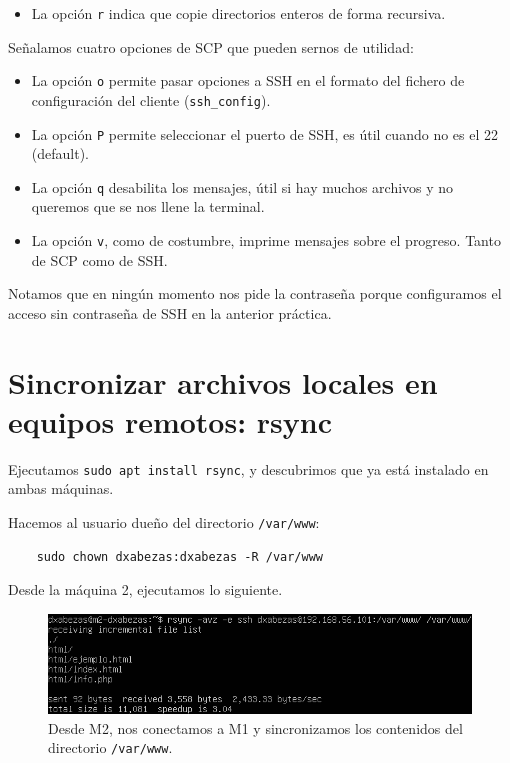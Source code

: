 \documentclass{article}
\begin{document}
\begin{itemize}
	\item La opción \texttt{r} indica que copie directorios enteros de forma recursiva.
\end{itemize}

Señalamos cuatro opciones de SCP que pueden sernos de utilidad:
\begin{itemize}
	\item La opción \texttt{o} permite pasar opciones a SSH en el formato del fichero de configuración del cliente
	 (\texttt{ssh\_config}).
	\item La opción \texttt{P} permite seleccionar el puerto de SSH, es útil cuando no es el 22 (default).
	\item La opción \texttt{q} desabilita los mensajes, útil si hay muchos archivos y no queremos que se nos llene la terminal.
	\item La opción \texttt{v}, como de costumbre, imprime mensajes sobre el progreso. Tanto de SCP como de SSH.
\end{itemize}

Notamos que en ningún momento nos pide la contraseña porque configuramos el acceso sin contraseña de SSH en la anterior práctica.

\section{Sincronizar archivos locales en equipos remotos: rsync}

Ejecutamos \texttt{sudo apt install rsync}, y descubrimos que ya está instalado en ambas máquinas.

Hacemos al usuario dueño del directorio \texttt{/var/www}:

\begin{verbatim}
	sudo chown dxabezas:dxabezas -R /var/www
\end{verbatim}

Desde la máquina 2, ejecutamos lo siguiente.

\begin{figure}[H]
	\centering
	\includegraphics[width=150mm]{imgs/rsync}
	\caption{Desde M2, nos conectamos a M1 y sincronizamos los contenidos del directorio \texttt{/var/www}.}
	\label{fig:rsync}
\end{figure}
\end{document}
